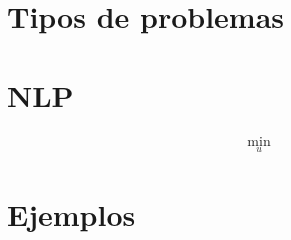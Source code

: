 \documentclass[]{article}
\begin{document}
\section{Tipos de problemas}

\section{NLP}

\begin{gather}
    \min_{u} 
\end{gather}
\section{Ejemplos}
\end{document}
